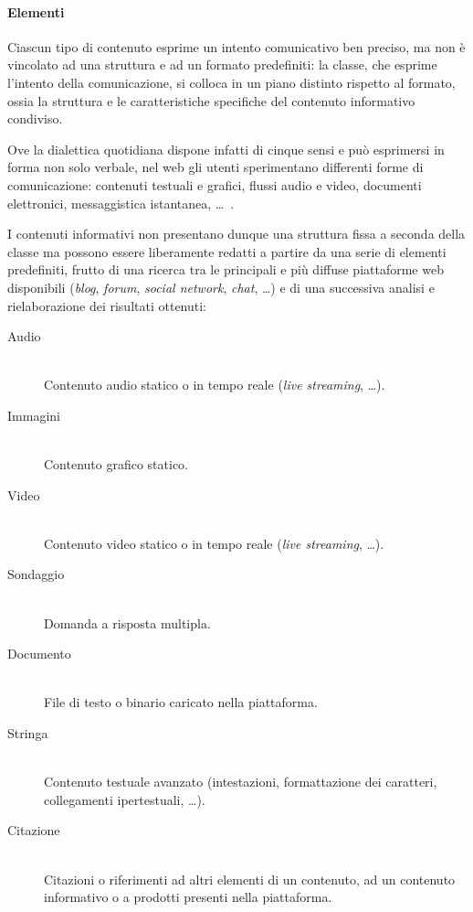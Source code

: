 \paragraph{Elementi}
Ciascun tipo di contenuto esprime un intento comunicativo ben preciso, ma non è vincolato ad una struttura e ad un formato predefiniti: la classe, che esprime l'intento della comunicazione, si colloca in un piano distinto rispetto al formato, ossia la struttura e le caratteristiche specifiche del contenuto informativo condiviso.

Ove la dialettica quotidiana dispone infatti di cinque sensi e può esprimersi in forma non solo verbale, nel web gli utenti sperimentano differenti forme di comunicazione: contenuti testuali e grafici, flussi audio e video, documenti elettronici, messaggistica istantanea, \ldots\ .

I contenuti informativi non presentano dunque una struttura fissa a seconda della classe ma possono essere liberamente redatti a partire da una serie di elementi predefiniti, frutto di una ricerca tra le principali e più diffuse piattaforme web disponibili (\textit{blog}, \textit{forum}, \textit{social network}, \textit{chat}, \ldots) e di una successiva analisi e rielaborazione dei risultati ottenuti:
\begin{description}
\item[Audio] \hfill \\
Contenuto audio statico o in tempo reale (\textit{live streaming}, \ldots).
\item[Immagini] \hfill \\
Contenuto grafico statico.
\item[Video] \hfill \\
Contenuto video statico o in tempo reale (\textit{live streaming}, \ldots).
\item[Sondaggio] \hfill \\
Domanda a risposta multipla.
\item[Documento] \hfill \\
File di testo o binario caricato nella piattaforma.
\item[Stringa] \hfill \\
Contenuto testuale avanzato (intestazioni, formattazione dei caratteri, collegamenti ipertestuali, \ldots).
\item[Citazione] \hfill \\
Citazioni o riferimenti ad altri elementi di un contenuto, ad un contenuto informativo o a prodotti presenti nella piattaforma. 
\end{description}

